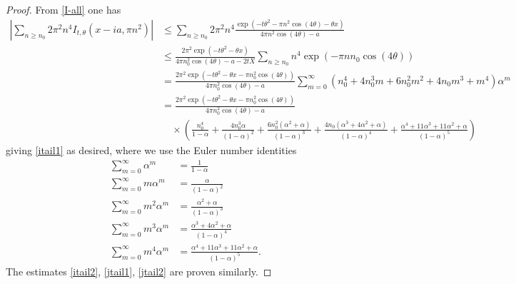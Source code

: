 \begin{proof}  From \eqref{I-all} one has
\begin{align*}
 |\sum_{n \geq n_0} 2\pi^2 n^4 I_{t,\theta}(x-ia, \pi n^2)|
&\leq \sum_{n \geq n_0} 2\pi^2 n^4 \frac{\exp( -t \theta^2 - \pi n^2 \cos(4\theta) - \theta x )}{4 \pi n^2 \cos(4\theta) - a} \\
&\leq \frac{2\pi^2 \exp(-t \theta^2 - \theta x)}{4\pi n_0^2 \cos(4\theta) - a- 2tX} \sum_{n \geq n_0} n^4 \exp( - \pi n n_0 \cos(4\theta)) \\ 
&= \frac{2\pi^2 \exp(-t \theta^2 - \theta x - \pi n_0^2 \cos(4\theta))}{4\pi n_0^2 \cos(4\theta) - a} \sum_{m=0}^\infty (n_0^4 + 4 n_0^3 m + 6 n_0^2 m^2 + 4 n_0 m^3 + m^4) \alpha^m \\
&= \frac{2\pi^2 \exp(-t \theta^2 - \theta x - \pi n_0^2 \cos(4\theta))}{4\pi n_0^2 \cos(4\theta) - a} \\
&\quad  \times ( \frac{n_0^4}{1 - \alpha} + 
\frac{4 n_0^3 \alpha}{(1 - \alpha)^2}  + \frac{6 n_0^2 (\alpha^2+\alpha)}{(1-\alpha)^3} + \frac{4n_0 (\alpha^3+4\alpha^2+\alpha)}{(1-\alpha)^4} + \frac{\alpha^4 + 11 \alpha^3 + 11 \alpha^2 + \alpha}{(1-\alpha)^5} ) 
\end{align*}
giving \eqref{itail1} as desired, where we use the Euler number identities
\begin{align*}
\sum_{m=0}^\infty \alpha^m &= \frac{1}{1-\alpha} \\
\sum_{m=0}^\infty m \alpha^m &= \frac{\alpha}{(1-\alpha)^2} \\
\sum_{m=0}^\infty m^2 \alpha^m &= \frac{\alpha^2+\alpha}{(1-\alpha)^3} \\
\sum_{m=0}^\infty m^3 \alpha^m &= \frac{\alpha^3+4\alpha^2+\alpha}{(1-\alpha)^4} \\
\sum_{m=0}^\infty m^4 \alpha^m &= \frac{\alpha^4+11\alpha^3+11\alpha^2+\alpha}{(1-\alpha)^5}.
\end{align*}
The estimates \eqref{itail2}, \eqref{jtail1}, \eqref{jtail2} are proven similarly.
\end{proof}